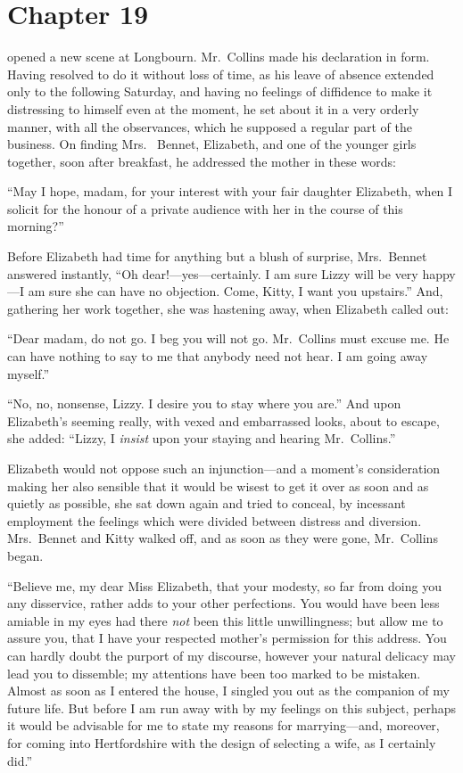 \chapter{Chapter 19}


 opened a new scene at Longbourn.  Mr.\ Collins
made his declaration in form.  Having resolved to do it without
loss of time, as his leave of absence extended only to the
following Saturday, and having no feelings of diffidence to make
it distressing to himself even at the moment, he set about it
in a very orderly manner, with all the observances, which
he supposed a regular part of the business.  On finding Mrs.\ %
Bennet, Elizabeth, and one of the younger girls together, soon
after breakfast, he addressed the mother in these words:

``May I hope, madam, for your interest with your fair daughter
Elizabeth, when I solicit for the honour of a private audience
with her in the course of this morning?''

Before Elizabeth had time for anything but a blush of surprise,
Mrs.\ Bennet answered instantly, ``Oh dear!---yes---certainly.  I
am sure Lizzy will be very happy---I am sure she can have no
objection.  Come, Kitty, I want you upstairs.''  And, gathering
her work together, she was hastening away, when Elizabeth
called out:

``Dear madam, do not go.  I beg you will not go.  Mr.\ Collins
must excuse me.  He can have nothing to say to me that anybody
need not hear.  I am going away myself.''

``No, no, nonsense, Lizzy.  I desire you to stay where you are.''
And upon Elizabeth's seeming really, with vexed and embarrassed
looks, about to escape, she added: ``Lizzy, I \emph{insist} upon your
staying and hearing Mr.\ Collins.''

Elizabeth would not oppose such an injunction---and a moment's
consideration making her also sensible that it would be wisest to
get it over as soon and as quietly as possible, she sat down again
and tried to conceal, by incessant employment the feelings which
were divided between distress and diversion. Mrs.\ Bennet and Kitty
walked off, and as soon as they were gone, Mr.\ Collins began.

``Believe me, my dear Miss Elizabeth, that your modesty, so far
from doing you any disservice, rather adds to your other
perfections.  You would have been less amiable in my eyes had
there \emph{not} been this little unwillingness; but allow me to assure
you, that I have your respected mother's permission for this
address.  You can hardly doubt the purport of my discourse,
however your natural delicacy may lead you to dissemble; my
attentions have been too marked to be mistaken.  Almost as soon
as I entered the house, I singled you out as the companion of
my future life.  But before I am run away with by my feelings on
this subject, perhaps it would be advisable for me to state my
reasons for marrying---and, moreover, for coming into Hertfordshire
with the design of selecting a wife, as I certainly did.''

